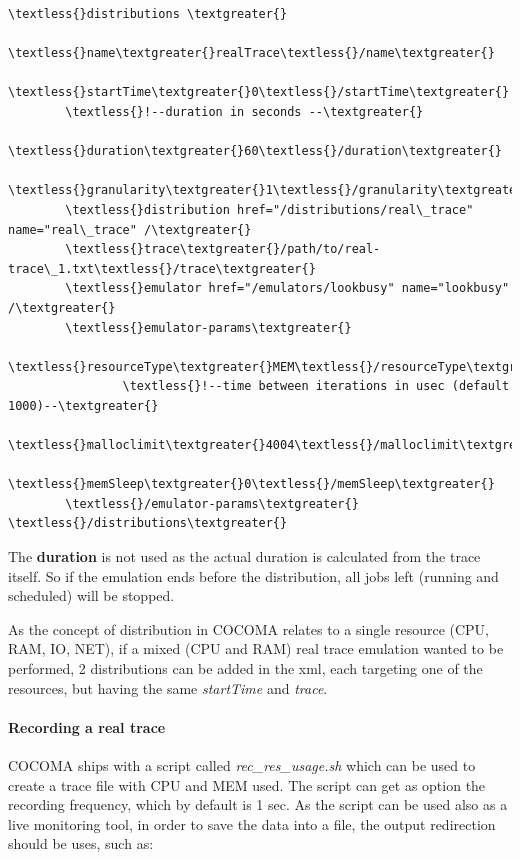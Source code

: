 \documentclass[letterpaper,10pt,english]{sphinxhowto}
\begin{document}
\begin{Verbatim}[commandchars=\\\{\}]
\textless{}distributions \textgreater{}
        \textless{}name\textgreater{}realTrace\textless{}/name\textgreater{}
        \textless{}startTime\textgreater{}0\textless{}/startTime\textgreater{}
        \textless{}!--duration in seconds --\textgreater{}
        \textless{}duration\textgreater{}60\textless{}/duration\textgreater{}
        \textless{}granularity\textgreater{}1\textless{}/granularity\textgreater{}
        \textless{}distribution href="/distributions/real\_trace" name="real\_trace" /\textgreater{}
        \textless{}trace\textgreater{}/path/to/real-trace\_1.txt\textless{}/trace\textgreater{}
        \textless{}emulator href="/emulators/lookbusy" name="lookbusy" /\textgreater{}
        \textless{}emulator-params\textgreater{}
                \textless{}resourceType\textgreater{}MEM\textless{}/resourceType\textgreater{}
                \textless{}!--time between iterations in usec (default 1000)--\textgreater{}
                \textless{}malloclimit\textgreater{}4004\textless{}/malloclimit\textgreater{}
                \textless{}memSleep\textgreater{}0\textless{}/memSleep\textgreater{}
        \textless{}/emulator-params\textgreater{}
\textless{}/distributions\textgreater{}
\end{Verbatim}

The \textbf{duration} is not used as the actual duration is calculated from the trace itself. So if the emulation ends before the distribution, all jobs left (running and scheduled) will be stopped.

As the concept of distribution in COCOMA relates to a single resource (CPU, RAM, IO, NET), if a mixed (CPU and RAM) real trace emulation wanted to be performed, 2 distributions can be added in the xml, each targeting one of the resources, but having the same \emph{startTime} and \emph{trace}.


\paragraph{Recording a real trace}
\label{COCOMA/06_additional_features:recording-a-real-trace}
COCOMA ships with a script called \emph{rec\_res\_usage.sh} which can be used to create a trace file with CPU and MEM used. The script can get as option the recording frequency, which by default is 1 sec. As the script can be used also as a live monitoring tool, in order to save the data into a file, the output redirection should be uses, such as:
\end{document}
